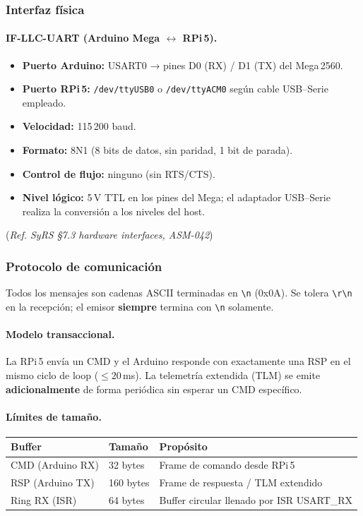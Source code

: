 \subsubsection{Interfaz física}

\paragraph{IF-LLC-UART (Arduino Mega $\leftrightarrow$ RPi\,5).}
\begin{itemize}
  \item \textbf{Puerto Arduino:} USART0 → pines D0 (RX) / D1 (TX) del Mega\,2560.
  \item \textbf{Puerto RPi\,5:} \texttt{/dev/ttyUSB0} o \texttt{/dev/ttyACM0}
        según cable USB–Serie empleado.
  \item \textbf{Velocidad:} 115\,200 baud.
  \item \textbf{Formato:} 8N1 (8 bits de datos, sin paridad, 1 bit de parada).
  \item \textbf{Control de flujo:} ninguno (sin RTS/CTS).
  \item \textbf{Nivel lógico:} 5\,V TTL en los pines del Mega;
        el adaptador USB–Serie realiza la conversión a los niveles del host.
\end{itemize}
(\emph{Ref. SyRS §7.3 hardware interfaces, ASM-042})

\subsubsection{Protocolo de comunicación}

Todos los mensajes son cadenas ASCII terminadas en \verb|\n| (0x0A).
Se tolera \verb|\r\n| en la recepción; el emisor \textbf{siempre} termina
con \verb|\n| solamente.

\paragraph{Modelo transaccional.}
La RPi\,5 envía un CMD y el Arduino responde con exactamente una RSP
en el mismo ciclo de loop ($\leq 20$\,ms).
La telemetría extendida (TLM) se emite \textbf{adicionalmente} de forma
periódica sin esperar un CMD específico.

\paragraph{Límites de tamaño.}
\begin{center}
\small
\begin{tabular}{lll}
\toprule
\textbf{Buffer} & \textbf{Tamaño} & \textbf{Propósito} \\
\midrule
CMD (Arduino RX) & 32 bytes & Frame de comando desde RPi\,5 \\
RSP (Arduino TX) & 160 bytes & Frame de respuesta / TLM extendido \\
Ring RX (ISR)    & 64 bytes & Buffer circular llenado por ISR USART\_RX \\
\bottomrule
\end{tabular}
\end{center}

